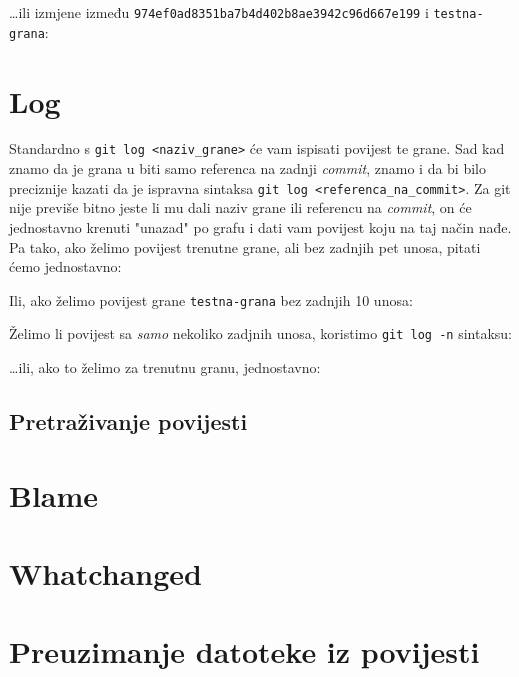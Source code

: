 \dots{}ili izmjene između \verb+974ef0ad8351ba7b4d402b8ae3942c96d667e199+ i \verb+testna-grana+:


\section*{Log}

Standardno s \verb+git log <naziv_grane>+ će vam ispisati povijest te grane.
Sad kad znamo da je grana u biti samo referenca na zadnji \emph{commit}, znamo i da bi bilo preciznije kazati da je ispravna sintaksa \verb+git log <referenca_na_commit>+.
Za git nije previše bitno jeste li mu dali naziv grane ili referencu na \emph{commit}, on će jednostavno krenuti "unazad" po grafu i dati vam povijest koju na taj način nađe.
Pa tako, ako želimo povijest trenutne grane, ali bez zadnjih pet unosa, pitati ćemo jednostavno:


Ili, ako želimo povijest grane \verb+testna-grana+ bez zadnjih 10 unosa:


Želimo li povijest sa \emph{samo} nekoliko zadjnih unosa, koristimo \verb+git log -n+ sintaksu:


\dots{}ili, ako to želimo za trenutnu granu, jednostavno:


\subsection*{Pretraživanje povijesti}

\section*{Blame}

\section*{Whatchanged}

\section*{Preuzimanje datoteke iz povijesti}

